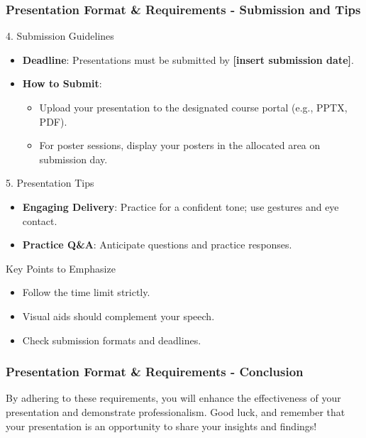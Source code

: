 \documentclass[aspectratio=169]{beamer}
\begin{document}
\begin{frame}[fragile]
    \frametitle{Presentation Format \& Requirements - Submission and Tips}
    \begin{block}{4. Submission Guidelines}
        \begin{itemize}
            \item \textbf{Deadline}: Presentations must be submitted by \textbf{[insert submission date]}.
            \item \textbf{How to Submit}:
                \begin{itemize}
                    \item Upload your presentation to the designated course portal (e.g., PPTX, PDF).
                    \item For poster sessions, display your posters in the allocated area on submission day.
                \end{itemize}
        \end{itemize}
    \end{block}
    
    \begin{block}{5. Presentation Tips}
        \begin{itemize}
            \item \textbf{Engaging Delivery}: Practice for a confident tone; use gestures and eye contact.
            \item \textbf{Practice Q\&A}: Anticipate questions and practice responses.
        \end{itemize}
    \end{block}
    
    \begin{block}{Key Points to Emphasize}
        \begin{itemize}
            \item Follow the time limit strictly.
            \item Visual aids should complement your speech.
            \item Check submission formats and deadlines.
        \end{itemize}
    \end{block}

\end{frame}

\begin{frame}[fragile]
    \frametitle{Presentation Format \& Requirements - Conclusion}
    By adhering to these requirements, you will enhance the effectiveness of your presentation and demonstrate professionalism. Good luck, and remember that your presentation is an opportunity to share your insights and findings!
\end{frame}
\end{document}
